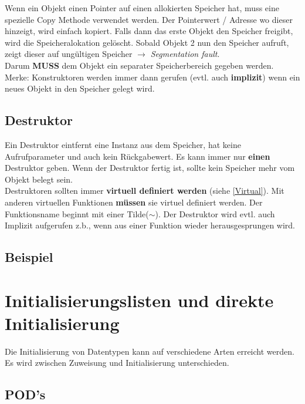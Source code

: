 Wenn ein Objekt einen Pointer auf einen allokierten Speicher hat, muss eine spezielle Copy Methode verwendet werden. 
Der Pointerwert / Adresse wo dieser hinzeigt, wird einfach kopiert. 
Falls dann das erste Objekt den Speicher freigibt, wird die Speicheralokation gelöscht. 
Sobald Objekt 2 nun den Speicher aufruft, zeigt dieser auf ungültigen Speicher $\rightarrow$ \textit{Segmentation fault}.\\
Darum \textbf{MUSS} dem Objekt ein separater Speicherbereich gegeben werden.\\

Merke: Konstruktoren werden immer dann gerufen (evtl. auch \textbf{implizit}) wenn ein neues Objekt in den Speicher gelegt wird.\\

\subsection{Destruktor}

Ein Destruktor eintfernt eine Instanz aus dem Speicher, 
hat keine Aufrufparameter und auch kein Rückgabewert. 
Es kann immer nur \textbf{einen} Destruktor geben. 
Wenn der Destruktor fertig ist, sollte kein Speicher mehr vom Objekt belegt sein.\\
Destruktoren sollten immer \textbf{virtuell definiert werden} (siehe \ref{Virtual}). 
Mit anderen virtuellen Funktionen \textbf{müssen} sie virtuel definiert werden. 
Der Funktionsname beginnt mit einer Tilde($\sim$). 
Der Destruktor wird evtl. auch Implizit aufgerufen z.b., wenn aus einer Funktion wieder herausgesprungen wird. 

\subsection{Beispiel}



\section{Initialisierungslisten und direkte Initialisierung}

Die Initialisierung von Datentypen kann auf verschiedene Arten erreicht werden. 
Es wird zwischen Zuweisung und Initialisierung unterschieden.

\subsection{POD's}

